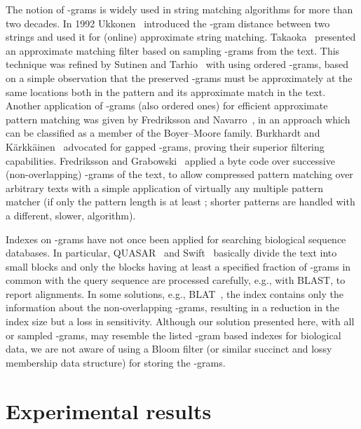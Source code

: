 \documentclass{llncs}
\begin{document}
The notion of -grams 
is widely used in string matching algorithms for more than two decades.
In 1992 Ukkonen~\cite{Ukk1992} introduced the -gram distance between 
two strings and used it for (online) approximate string matching.
Takaoka~\cite{T1994} presented an approximate matching filter based on 
sampling -grams from the text.
This technique was refined by Sutinen and Tarhio~\cite{ST1995} 
with using ordered -grams, based on a simple observation that 
the preserved -grams must be approximately at the same locations 
both in the pattern and its approximate match in the text.
Another application of -grams (also ordered ones) for efficient 
approximate pattern matching was given by Fredriksson and Navarro~\cite{FNjea2004}, 
in an approach which can be classified as a member of the Boyer--Moore family.
Burkhardt and K{\"a}rkk{\"a}inen~\cite{BK2001} advocated for gapped -grams, 
proving their superior filtering capabilities.
Fredriksson and Grabowski~\cite{FG2006} applied a byte code over 
successive (non-overlapping) 
-grams of the text, to allow compressed pattern matching over 
arbitrary texts with a simple application of virtually any multiple pattern 
matcher (if only the pattern length is at least ; 
shorter patterns are handled with a different, slower, algorithm).

Indexes on -grams have not once been applied for searching 
biological sequence databases.
In particular, QUASAR~\cite{BCFLRV1999} and Swift~\cite{RSM2006} basically 
divide the text into small blocks and only the blocks having at least 
a specified fraction of -grams in common with the query sequence 
are processed carefully, e.g., with BLAST, to report alignments.
In some solutions, e.g., BLAT~\cite{Kent2002blat}, the index contains 
only the information about the non-overlapping -grams, resulting 
in a reduction in the index size but a loss in sensitivity.
Although our solution presented here, with all or sampled -grams, 
may resemble the listed -gram based indexes for biological data, 
we are not aware of using a Bloom filter (or similar succinct and lossy membership 
data structure) for storing the -grams.



\section{Experimental results}
\label{sec:exp}
\end{document}
